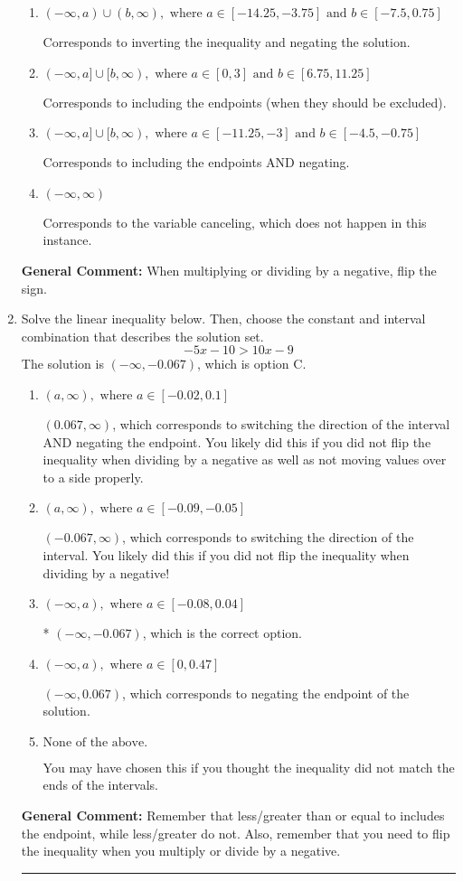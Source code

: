 \documentclass{extbook}[14pt]
\newcommand{\litem}[1]{\item #1

\rule{\textwidth}{0.4pt}}
\begin{document}
\begin{enumerate}
{\begin{enumerate}[label=\Alph*.]
 * Correct option.
\item \( (-\infty, a) \cup (b, \infty), \text{ where } a \in [-14.25, -3.75] \text{ and } b \in [-7.5, 0.75] \)

Corresponds to inverting the inequality and negating the solution.
\item \( (-\infty, a] \cup [b, \infty), \text{ where } a \in [0, 3] \text{ and } b \in [6.75, 11.25] \)

Corresponds to including the endpoints (when they should be excluded).
\item \( (-\infty, a] \cup [b, \infty), \text{ where } a \in [-11.25, -3] \text{ and } b \in [-4.5, -0.75] \)

Corresponds to including the endpoints AND negating.
\item \( (-\infty, \infty) \)

Corresponds to the variable canceling, which does not happen in this instance.
\end{enumerate}

\textbf{General Comment:} When multiplying or dividing by a negative, flip the sign.
}
\litem{
Solve the linear inequality below. Then, choose the constant and interval combination that describes the solution set.
\[ -5x -10 > 10x -9 \]The solution is \( (-\infty, -0.067) \), which is option C.\begin{enumerate}[label=\Alph*.]
\item \( (a, \infty), \text{ where } a \in [-0.02, 0.1] \)

 $(0.067, \infty)$, which corresponds to switching the direction of the interval AND negating the endpoint. You likely did this if you did not flip the inequality when dividing by a negative as well as not moving values over to a side properly.
\item \( (a, \infty), \text{ where } a \in [-0.09, -0.05] \)

 $(-0.067, \infty)$, which corresponds to switching the direction of the interval. You likely did this if you did not flip the inequality when dividing by a negative!
\item \( (-\infty, a), \text{ where } a \in [-0.08, 0.04] \)

* $(-\infty, -0.067)$, which is the correct option.
\item \( (-\infty, a), \text{ where } a \in [0, 0.47] \)

 $(-\infty, 0.067)$, which corresponds to negating the endpoint of the solution.
\item \( \text{None of the above}. \)

You may have chosen this if you thought the inequality did not match the ends of the intervals.
\end{enumerate}

\textbf{General Comment:} Remember that less/greater than or equal to includes the endpoint, while less/greater do not. Also, remember that you need to flip the inequality when you multiply or divide by a negative.
}
\end{enumerate}
\end{document}
